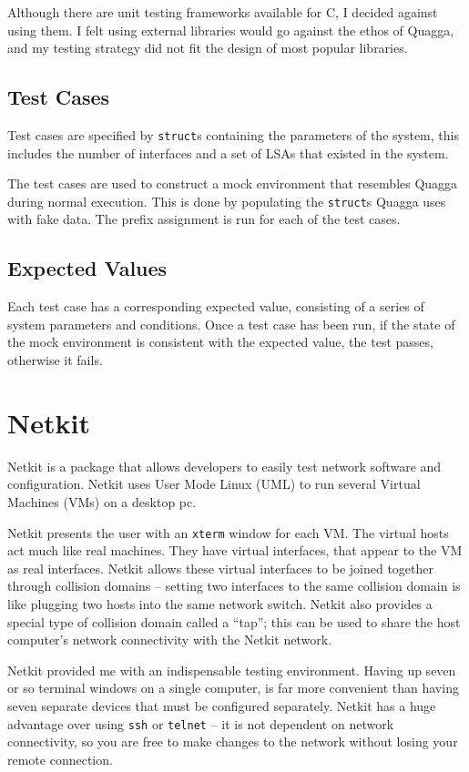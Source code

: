 \documentclass[12pt]{report}
\begin{document}
Although there are unit testing frameworks available for C, I decided against
using them.  I felt using external libraries  would go against the ethos of
Quagga, and my testing strategy did not fit the design of most popular
libraries. 

\subsection{Test Cases}
Test cases are specified by \texttt{struct}s containing the parameters of
the system, this includes the number of interfaces and a set of LSAs that
existed in the system. 

The test cases are used to construct a mock environment that resembles
Quagga during normal execution. This is done by populating the \texttt{struct}s
Quagga uses with fake data. The prefix assignment is run for each of the test
cases. 

\subsection{Expected Values}
Each test case has a corresponding expected value, consisting of a
series of system parameters and conditions. Once a test case has been run, if
the state of the mock environment is consistent with the expected value, the
test passes, otherwise it fails. 

\section{Netkit} 
Netkit is a package that allows developers to easily test network software and
configuration. Netkit uses User Mode Linux (UML)  to run several Virtual Machines (VMs) 
on a desktop pc. 

Netkit presents the user with an \texttt{xterm} window for each VM. The virtual hosts act much like real machines. They have
virtual interfaces, that appear to the VM as real interfaces. Netkit allows
these virtual interfaces to be joined together through collision domains
-- setting two interfaces to the same collision domain is like plugging two
hosts into the same network switch. Netkit also provides a special type of
collision domain called a ``tap''; this can be used to share the host computer's
network connectivity with the Netkit network.

Netkit provided me with an indispensable testing environment.  Having up seven
or so terminal windows on a single computer, is far more convenient than having
seven separate devices that must be configured separately. Netkit has a huge
advantage over using \texttt{ssh} or \texttt{telnet} -- it is not dependent on
network connectivity, so you are free to make changes to the network without
losing your remote connection.   
\end{document}
